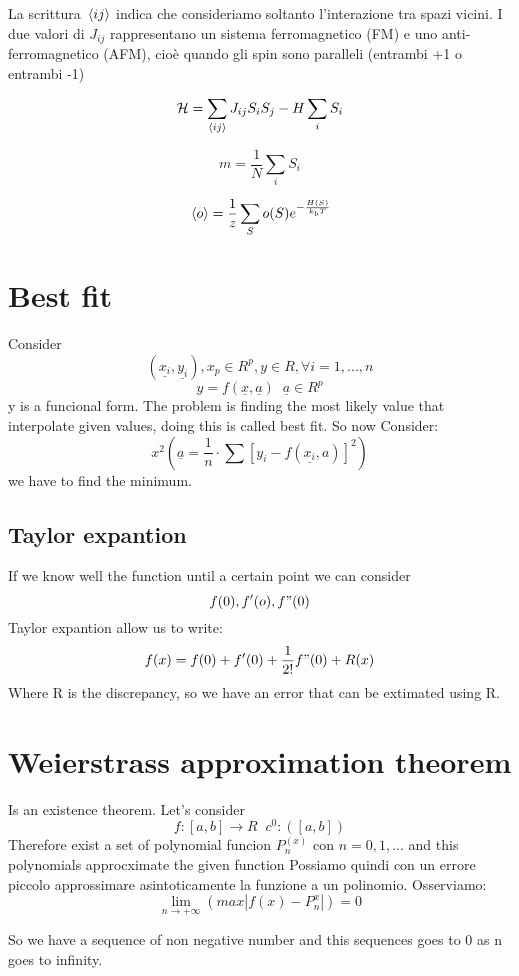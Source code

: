 La scrittura $\expval*{ij}$ indica che consideriamo soltanto l'interazione tra spazi vicini. I due valori di $J_{ij}$ rappresentano un sistema ferromagnetico (FM) e uno anti-ferromagnetico (AFM), cioè quando gli spin sono paralleli (entrambi +1 o entrambi -1)

$$\mathcal{H}=\sum_{\expval{ij}} J_{ij} S_i S_j - H \sum_{i} S_i$$

$$m=\frac{1}{N} \sum_{i} S_i$$

$$\expval*{o}=\frac{1}{z} \sum_{S} o(S) e^{-\frac{H(S)}{k_b T}}$$

\section{Best fit}
Consider 
\[(\underline{x_i},\underline{y_i}), x_p \in R^p, y \in R, \forall i=1,...,n \] 
\[ y=f(\underline{x},\underline{a}) \; \; \underline{a} \in R^p\]
y is a funcional form.
The problem is finding the most likely value that interpolate given values, doing this is called best fit.
So now Consider:\[x^2(\underline{a}=\frac{1}{n}\cdot \sum [y_i-f(\underline{x_i},a)]^2)\] we have to find the minimum. 

\subsection{Taylor expantion}
If we know well the function until a certain point we can consider
\[f(0),f'(o),f"(0)\] 
Taylor expantion allow us to write:
\[f(x)=f(0)+f'(0)+\frac{1}{2!}f"(0)+R(x)\]
Where R is the discrepancy, so we have an error that can be extimated using R.

\section{Weierstrass approximation theorem}
Is an existence theorem. Let's consider 
\[f:[a,b] \rightarrow R \; \; c^0:([a,b])\]
Therefore exist a set of polynomial funcion $P^{(x)}_n$ con $n=0,1,...$ and this polynomials approcximate the given function
Possiamo quindi con un errore piccolo approssimare asintoticamente la funzione a un polinomio. Osserviamo:
\[\lim_{n\to +\infty}(max |{f(x)-P^{x}_n}|)=0\]

So we have a sequence of non negative number and this sequences goes to 0 as n goes to infinity.
 
